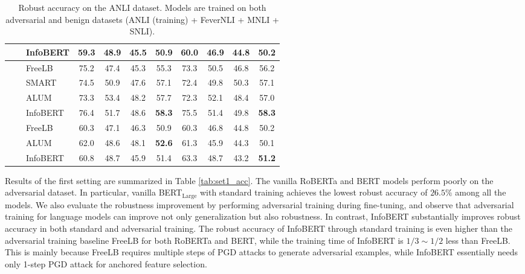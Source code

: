\documentclass{article} \usepackage{iclr2021_conference,times}
\theoremstyle{definition}
\theoremstyle{remark}
\newcommand{\method}{InfoBERT\xspace}
\begin{document}
\begin{table}[t]
{\begin{tabular}{c|c|l|cccc|cccc}
                                                  &                                       & InfoBERT  & 59.3 & 48.9 & 45.5 & \textbf{50.9} & 60.0 & 46.9 & 44.8 & \textbf{50.2} \\
\midrule
\midrule 
{} &  & FreeLB     &  75.2 & 47.4 & 45.3 & 55.3 & 73.3 & 50.5 & 46.8 & 56.2 \\
                                                  &                                       &  SMART     &  74.5 & 50.9 & 47.6 & 57.1 & 72.4 & 49.8 & 50.3 & 57.1 \\
                                                  &                                       &  ALUM       &  73.3 & 53.4 & 48.2 & 57.7 & 72.3 & 52.1 & 48.4 & 57.0 \\
                                                  &                                       & InfoBERT    & 76.4 & 51.7 & 48.6 & \textbf{58.3} & 75.5 & 51.4 & 49.8 & \textbf{58.3}  \\
                                                  &      & FreeLB    &  60.3 & 47.1 & 46.3 & 50.9 & 60.3 & 46.8 & 44.8 & 50.2 \\
                                                  &                                       & ALUM        &  62.0 & 48.6 & 48.1 & \textbf{52.6} & 61.3 & 45.9 & 44.3 & 50.1 \\
                                                  &                                       & InfoBERT     &  60.8 & 48.7 & 45.9 & 51.4 & 63.3 & 48.7 & 43.2 & \textbf{51.2} \\
\bottomrule
\end{tabular}
}
\caption{Robust accuracy on the ANLI dataset.  Models are trained on both adversarial and benign datasets (ANLI (training) + FeverNLI + MNLI + SNLI). } 
\label{tab:set2_acc}
\vspace{-3mm}
\end{table} Results of the first setting are summarized in Table \ref{tab:set1_acc}. The vanilla RoBERTa and BERT models perform poorly on the adversarial dataset. In particular, vanilla BERT$_{\text{Large}}$ with standard training achieves the lowest robust accuracy of $26.5\%$ among all the models. We also evaluate the robustness improvement by performing adversarial training during fine-tuning, and observe that adversarial training for language models can improve not only generalization but also robustness. In contrast, \method substantially improves robust accuracy in both standard and adversarial training. The robust accuracy of \method through standard training is even higher than the adversarial training baseline FreeLB for both RoBERTa and BERT, while the training time of \method is $1/3 \sim 1/2$ less than FreeLB. This is mainly because FreeLB requires multiple steps of PGD attacks to generate adversarial examples, while \method essentially needs only 1-step PGD attack for anchored feature selection. 
\end{document}
